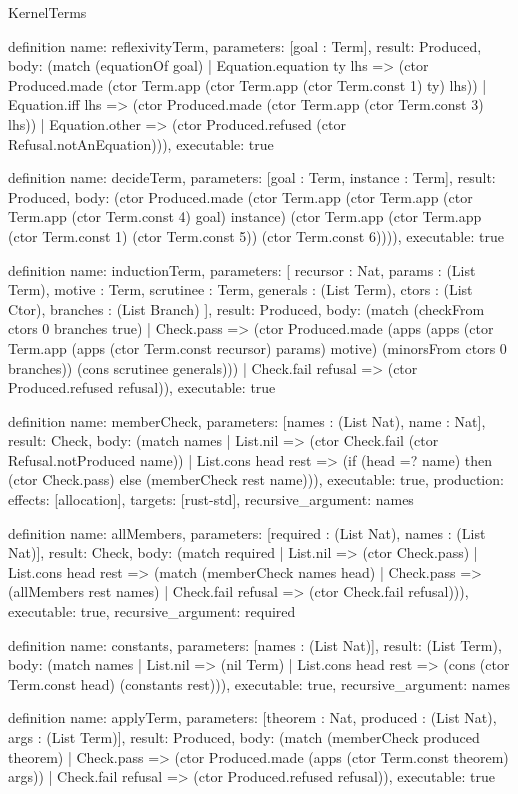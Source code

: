 \begin{lexlean}{KernelTerms}
\begin{semanticmodule}
definition{
  name: reflexivityTerm,
  parameters: [goal : Term],
  result: Produced,
  body: (match (equationOf goal)
    | Equation.equation ty lhs => (ctor Produced.made (ctor Term.app (ctor Term.app (ctor Term.const 1) ty) lhs))
    | Equation.iff lhs => (ctor Produced.made (ctor Term.app (ctor Term.const 3) lhs))
    | Equation.other => (ctor Produced.refused (ctor Refusal.notAnEquation))),
  executable: true
}

definition{
  name: decideTerm,
  parameters: [goal : Term, instance : Term],
  result: Produced,
  body: (ctor Produced.made (ctor Term.app (ctor Term.app (ctor Term.app (ctor Term.const 4) goal) instance) (ctor Term.app (ctor Term.app (ctor Term.const 1) (ctor Term.const 5)) (ctor Term.const 6)))),
  executable: true
}

definition{
  name: inductionTerm,
  parameters: [
    recursor : Nat,
    params : (List Term),
    motive : Term,
    scrutinee : Term,
    generals : (List Term),
    ctors : (List Ctor),
    branches : (List Branch)
  ],
  result: Produced,
  body: (match (checkFrom ctors 0 branches true)
    | Check.pass => (ctor Produced.made (apps (apps (ctor Term.app (apps (ctor Term.const recursor) params) motive) (minorsFrom ctors 0 branches)) (cons scrutinee generals)))
    | Check.fail refusal => (ctor Produced.refused refusal)),
  executable: true
}

definition{
  name: memberCheck,
  parameters: [names : (List Nat), name : Nat],
  result: Check,
  body: (match names
    | List.nil => (ctor Check.fail (ctor Refusal.notProduced name))
    | List.cons head rest => (if (head =? name) then (ctor Check.pass) else (memberCheck rest name))),
  executable: true,
  production: {effects: [allocation], targets: [rust-std]},
  recursive_argument: names
}

definition{
  name: allMembers,
  parameters: [required : (List Nat), names : (List Nat)],
  result: Check,
  body: (match required
    | List.nil => (ctor Check.pass)
    | List.cons head rest => (match (memberCheck names head)
      | Check.pass => (allMembers rest names)
      | Check.fail refusal => (ctor Check.fail refusal))),
  executable: true,
  recursive_argument: required
}

definition{
  name: constants,
  parameters: [names : (List Nat)],
  result: (List Term),
  body: (match names
    | List.nil => (nil Term)
    | List.cons head rest => (cons (ctor Term.const head) (constants rest))),
  executable: true,
  recursive_argument: names
}

definition{
  name: applyTerm,
  parameters: [theorem : Nat, produced : (List Nat), args : (List Term)],
  result: Produced,
  body: (match (memberCheck produced theorem)
    | Check.pass => (ctor Produced.made (apps (ctor Term.const theorem) args))
    | Check.fail refusal => (ctor Produced.refused refusal)),
  executable: true
}


\end{semanticmodule}
\end{lexlean}

